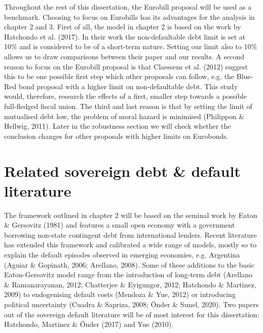 Throughout the rest of this dissertation, the Eurobill proposal will be used as a benchmark. Choosing to focus on Eurobills has its advantages for the analysis in chapter 2 and 3. First of all, the model in chapter 2 is based on the work by Hatchondo et al. (2017). In their work the non-defaultable debt limit is set at 10\% and is considered to be of a short-term nature. Setting our limit also to 10\% allows us to draw comparisons between their paper and our results. A second reason to focus on the Eurobill proposal is that Claessens et al. (2012) suggest this to be one possible first step which other proposals can follow, e.g. the Blue-Red bond proposal with a higher limit on non-defaultable debt. This study would, therefore, research the effects of a first, smaller step towards a possible full-fledged fiscal union. The third and last reason is that by setting the limit of mutualised debt low, the problem of moral hazard is minimised (Philippon \& Hellwig, 2011). Later in the robustness section we will check whether the conclusion changes for other proposals with higher limits on Eurobonds.\\

\section{Related sovereign debt \& default literature}
The framework outlined in chapter 2 will be based on the seminal work by Eaton \& Gersovitz (1981) and features a small open economy with a government borrowing non-state contingent debt from international lenders. Recent literature has extended this framework and calibrated a wide range of models, mostly so to explain the default episodes observed in emerging economies, e.g. Argentina (Aguiar \& Gopinath, 2006; Arellano, 2008). Some of these additions to the basic Eaton-Gersovitz model range from the introduction of long-term debt (Arellano \& Ramanarayanan, 2012; Chatterjee \& Eyigungor, 2012; Hatchondo \& Martinez, 2009) to endogenising default costs (Mendoza \& Yue, 2012) or introducing political uncertainty (Cuadra \& Sapriza, 2008; Önder \& Sunel, 2020). Two papers out of the sovereign default literature will be of most interest for this dissertation: Hatchondo, Martinez \& Önder (2017) and Yue (2010).\\

